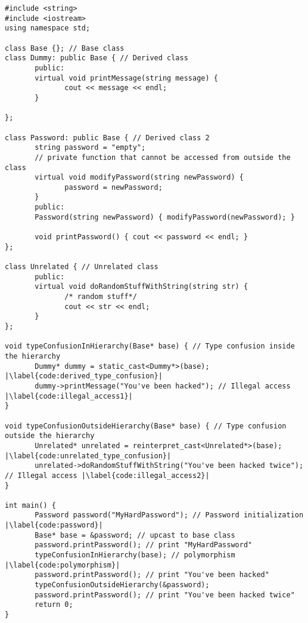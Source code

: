 \documentclass[a4paper,11pt,oneside]{report}
\begin{document}
\begin{listing}
       \begin{verbatim}
#include <string>
#include <iostream>
using namespace std;

class Base {}; // Base class
class Dummy: public Base { // Derived class
       public:
       virtual void printMessage(string message) {
              cout << message << endl;
       }
       
};

class Password: public Base { // Derived class 2
       string password = "empty";
       // private function that cannot be accessed from outside the class
       virtual void modifyPassword(string newPassword) {
              password = newPassword;
       }
       public:
       Password(string newPassword) { modifyPassword(newPassword); }

       void printPassword() { cout << password << endl; }
};

class Unrelated { // Unrelated class
       public: 
       virtual void doRandomStuffWithString(string str) {
              /* random stuff*/
              cout << str << endl;
       }
};

void typeConfusionInHierarchy(Base* base) { // Type confusion inside the hierarchy
       Dummy* dummy = static_cast<Dummy*>(base); |\label{code:derived_type_confusion}|
       dummy->printMessage("You've been hacked"); // Illegal access |\label{code:illegal_access1}|
}

void typeConfusionOutsideHierarchy(Base* base) { // Type confusion outside the hierarchy
       Unrelated* unrelated = reinterpret_cast<Unrelated*>(base); |\label{code:unrelated_type_confusion}|
       unrelated->doRandomStuffWithString("You've been hacked twice"); // Illegal access |\label{code:illegal_access2}|
}

int main() {
       Password password("MyHardPassword"); // Password initialization |\label{code:password}|
       Base* base = &password; // upcast to base class
       password.printPassword(); // print "MyHardPassword"
       typeConfusionInHierarchy(base); // polymorphism |\label{code:polymorphism}|
       password.printPassword(); // print "You've been hacked"
       typeConfusionOutsideHierarchy(&password);
       password.printPassword(); // print "You've been hacked twice"
       return 0;
}
       \end{verbatim}
       \caption{Example of type confusion in C++ within the same class hierarchy}
       \label{lst:type_confusion}
\end{listing}
\end{document}
